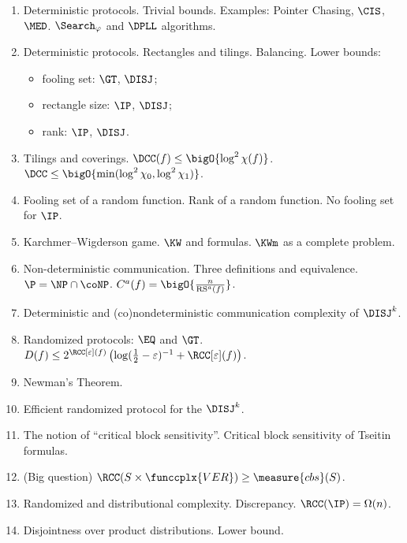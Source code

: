 






\begin{enumerate}
    \item Deterministic protocols. Trivial bounds. Examples: Pointer Chasing, $\CIS$,
        $\MED$. $\Search_{\varphi}$ and $\DPLL$ algorithms.
    \item Deterministic protocols. Rectangles and tilings. Balancing.
        Lower bounds:
        \begin{itemize}
            \item fooling set: $\GT$, $\DISJ$;
            \item rectangle size: $\IP$, $\DISJ$;
            \item rank: $\IP$, $\DISJ$.
        \end{itemize}
    \item Tilings and coverings. $\DCC(f) \le \bigO{\log^2 \chi(f)}$.
        $\DCC \le \bigO{\min( \log^2 \chi_0, \log^2 \chi_1)}$.
    \item Fooling set of a random function. Rank of a random function. No fooling set for $\IP$.
    \item Karchmer--Wigderson game. $\KW$ and formulas. $\KWm$ as a complete problem.
    \item Non-deterministic communication. Three definitions and equivalence. $\P = \NP \cap
        \coNP$. $C^a(f) = \bigO{\frac{n}{\mathrm{RS}^a(f)}}$.
    \item Deterministic and (co)nondeterministic communication complexity of $\DISJ^k$.
    \item Randomized protocols: $\EQ$ and $\GT$.
        $D(f) \le 2^{\RCC[\varepsilon](f)} \left( \log(\frac{1}{2} - \varepsilon)^{-1} + \RCC[\varepsilon](f)
        \right)$.
    \item Newman's Theorem.
    \item Efficient randomized protocol for the $\DISJ^k$.
    \item The notion of ``critical block sensitivity''. Critical block sensitivity of Tseitin
        formulas.
    \item (Big question) $\RCC(S \times \funccplx{VER}) \ge \measure{cbs}(S)$.
    \item Randomized and distributional complexity. Discrepancy. $\RCC(\IP) = \Omega(n)$.
    \item Disjointness over product distributions. Lower bound.

\end{enumerate}
